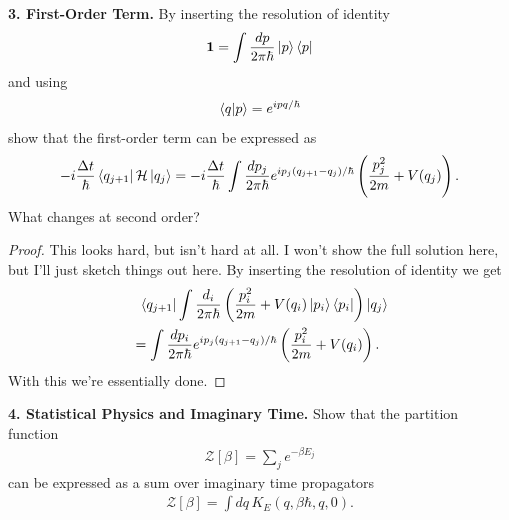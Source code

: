 \documentclass{book}
\theoremstyle{definition}
\newcommand{\nn}{\nonumber}
\newcommand{\had}{\mathcal{H}}
\newcommand{\f}[2]{\frac{#1}{#2}}
\newcommand{\lp}{\left(}
\newcommand{\rp}{\right)}
\begin{document}
\noindent \textbf{3. First-Order Term.} By inserting the resolution of identity
\begin{align}
\bm{1} = \int\f{dp}{2\pi \hbar} \ket{p}\bra{p}
\end{align}
and using
\begin{align}
\braket{q}{p} = e^{ipq/\hbar}
\end{align}
show that the first-order term can be expressed as
\begin{align}
-i\f{\Delta t}{\hbar} \bra{q_{j+1}} \had\ket{q_j} = -i \f{\Delta t}{ \hbar} \int \f{dp_j}{2\pi \hbar} e^{ip_j(q_{j+1} - q_j)/\hbar} \lp \f{p_j^2}{2m} + V(q_j) \rp.
\end{align}
What changes at second order?


\begin{proof}
	This looks hard, but isn't hard at all. I won't show the full solution here, but I'll just sketch things out here. By inserting the resolution of identity we get
	\begin{align}
	&\,\,\,\bra{q_{j+1}} \int \f{d_i}{2\pi \hbar} \lp \f{p_i^2}{2m} + V(q_i) \ket{p_i} \bra{p_i} \rp \ket{q_j} \nn\\
	&= \int\f{dp_i}{2\pi \hbar} e^{ip_j(q_{j+1} - q_j)/\hbar}\lp \f{p_i^2}{2m} + V(q_i) \rp.
	\end{align}
	With this we're essentially done. 
\end{proof}




\noindent \textbf{4. Statistical Physics and Imaginary Time.} Show that the partition function 
\begin{align}
\mathcal{Z}[\beta] = \sum_j e^{-\beta E_j}
\end{align}
can be expressed as a sum over imaginary time propagators
\begin{align}
\mathcal{Z}[\beta] = \int dq\, K_E (q,\beta \hbar, q,0).
\end{align}
\end{document}

